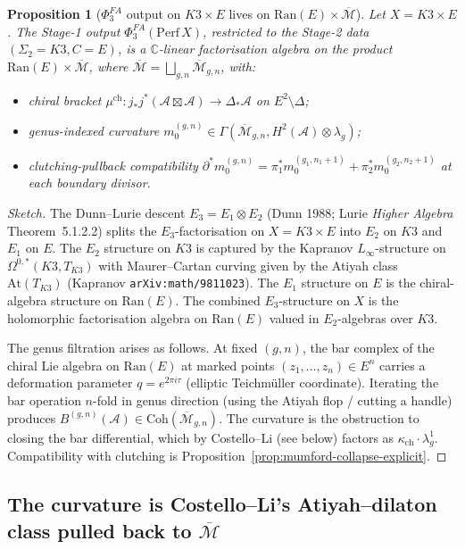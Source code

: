 \documentclass[11pt]{amsart}
\newtheorem{proposition}[theorem]{Proposition}
\newcommand{\kch}{\kappa_{\mathrm{ch}}}
\newcommand{\cA}{\mathcal{A}}
\newcommand{\Ran}{\mathrm{Ran}}
\newcommand{\Mbar}{\overline{\mathcal{M}}}
\newcommand{\Perf}{\mathrm{Perf}}
\newcommand{\At}{\mathrm{At}}
\newcommand{\bC}{\mathbb{C}}
\begin{document}
\begin{proposition}[$\Phi^{FA}_3$ output on $K3\times E$ lives on
$\Ran(E) \times \Mbar$]
\label{prop:k3xe-ran-mbar}
Let $X = K3 \times E$. The Stage-1 output $\Phi^{FA}_3(\Perf\,X)$,
restricted to the Stage-2 data $(\Sigma_2 = K3, C = E)$, is a
$\bC$-linear factorisation algebra on the product
$\Ran(E) \times \Mbar$, where $\Mbar = \bigsqcup_{g,n} \Mbar_{g,n}$,
with:
\begin{itemize}[leftmargin=2em]
\item chiral bracket $\mu^{\mathrm{ch}} : j_\ast j^\ast
(\cA \boxtimes \cA) \to \Delta_\ast \cA$ on $E^2 \setminus \Delta$;
\item genus-indexed curvature $m_0^{(g,n)} \in
\Gamma(\Mbar_{g,n}, H^2(\cA) \otimes \lambda_g)$;
\item clutching-pullback compatibility $\partial^* m_0^{(g,n)} =
\pi_1^* m_0^{(g_1,n_1+1)} + \pi_2^* m_0^{(g_2,n_2+1)}$ at each
boundary divisor.
\end{itemize}
\end{proposition}

\begin{proof}[Sketch]
The Dunn--Lurie descent $E_3 = E_1 \otimes E_2$ (Dunn 1988;
Lurie \emph{Higher Algebra} Theorem~5.1.2.2) splits the
$E_3$-factorisation on $X = K3 \times E$ into $E_2$ on $K3$ and
$E_1$ on $E$. The $E_2$ structure on $K3$ is captured by the
Kapranov $L_\infty$-structure on $\Omega^{0,*}(K3, T_{K3})$ with
Maurer--Cartan curving given by the Atiyah class $\At(T_{K3})$
(Kapranov \texttt{arXiv:math/9811023}). The $E_1$ structure on
$E$ is the chiral-algebra structure on $\Ran(E)$. The combined
$E_3$-structure on $X$ is the holomorphic factorisation algebra
on $\Ran(E)$ valued in $E_2$-algebras over $K3$.

The genus filtration arises as follows. At fixed $(g,n)$, the bar
complex of the chiral Lie algebra on $\Ran(E)$ at marked points
$(z_1, \dots, z_n) \in E^n$ carries a deformation parameter
$q = e^{2\pi i\tau}$ (elliptic Teichmüller coordinate). Iterating
the bar operation $n$-fold in genus direction (using the Atiyah
flop / cutting a handle) produces $B^{(g,n)}(\cA) \in
\mathrm{Coh}(\Mbar_{g,n})$. The curvature is the obstruction to
closing the bar differential, which by Costello--Li (see below)
factors as $\kch \cdot \lambda_g^1$. Compatibility with clutching
is Proposition~\ref{prop:mumford-collapse-explicit}.
\end{proof}

\subsection{The curvature is Costello--Li's Atiyah--dilaton class
pulled back to $\Mbar$}
\end{document}
